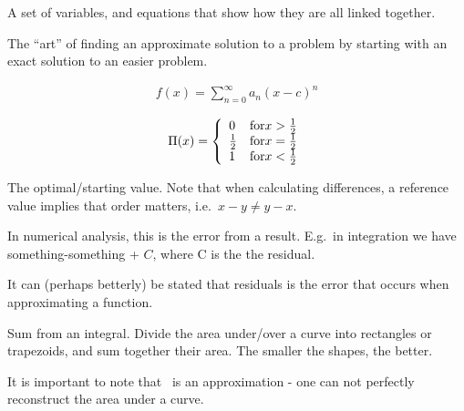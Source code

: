 \begin{definition}
    A set of variables, and equations that show how they are all linked 
    together.
\end{definition}

\begin{definition}\label{pertubation}
    The ``art'' of finding an approximate solution to a problem by starting
    with an exact solution to an easier problem.
\end{definition}


\begin{definition}\label{powerseries}
    \begin{align}
        f(x) = \sum\limits_{n=0}^{\infty}{a_{n}{(x-c)}^{n}}
    \end{align}
\end{definition}

\begin{definition}
    $$
    \Pi(x) = \left\{
            \begin{array}{l l}
                0 & \text{for} x > \frac{1}{2} \\
                \frac{1}{2} & \text{for} x = \frac{1}{2} \\
                1 & \text{for} x < \frac{1}{2} \\
            \end{array}
        \right.
    $$
\end{definition}

\begin{definition}
    The optimal/starting value. Note that when calculating differences,
    a reference value implies that order matters, i.e.\ $ x - y \neq y - x$.

\end{definition}

\begin{definition}[Residual]
    In numerical analysis, this is the error from a result.
    E.g.\ in integration we have something-something + $C$, where C is the 
    the residual.

    It can (perhaps betterly) be stated that residuals is the error that occurs
    when approximating a function.

\end{definition}

\begin{definition}\label{riemannsum}
    Sum from an integral. Divide the area under/over a curve into rectangles
    or trapezoids, and sum together their area. The smaller the shapes, the
    better.

    It is important to note that~ is an approximation - 
    one can not perfectly reconstruct the area under a curve.
\end{definition}

